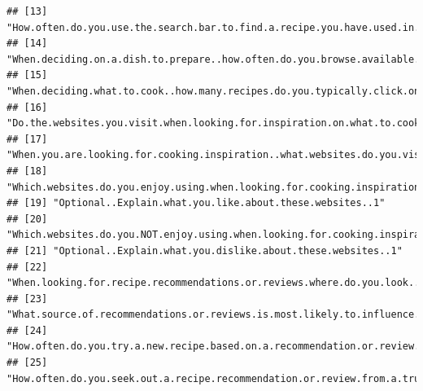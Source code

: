 \documentclass[
]{article}
\begin{document}
\begin{verbatim}
## [13] "How.often.do.you.use.the.search.bar.to.find.a.recipe.you.have.used.in.the.past."                                                                                                                           
## [14] "When.deciding.on.a.dish.to.prepare..how.often.do.you.browse.available.articles.or.recipe.collections.for.inspiration.on.what.to.cook."                                                                     
## [15] "When.deciding.what.to.cook..how.many.recipes.do.you.typically.click.on.before.you.find.a.suitable.recipe."                                                                                                 
## [16] "Do.the.websites.you.visit.when.looking.for.inspiration.on.what.to.cook.differ.from.the.websites.you.use.to.find.specific.recipes...i.e.looking.for.Mexican.food.instead.of.specifically.a.carnitas.recipe."
## [17] "When.you.are.looking.for.cooking.inspiration..what.websites.do.you.visit.the.most.."                                                                                                                       
## [18] "Which.websites.do.you.enjoy.using.when.looking.for.cooking.inspiration."                                                                                                                                   
## [19] "Optional..Explain.what.you.like.about.these.websites..1"                                                                                                                                                   
## [20] "Which.websites.do.you.NOT.enjoy.using.when.looking.for.cooking.inspiration."                                                                                                                               
## [21] "Optional..Explain.what.you.dislike.about.these.websites..1"                                                                                                                                                
## [22] "When.looking.for.recipe.recommendations.or.reviews.where.do.you.look..Select.all.that.apply"                                                                                                               
## [23] "What.source.of.recommendations.or.reviews.is.most.likely.to.influence.your.recipe.choice..Select.all.that.apply"                                                                                           
## [24] "How.often.do.you.try.a.new.recipe.based.on.a.recommendation.or.review.from.a.trusted.source."                                                                                                              
## [25] "How.often.do.you.seek.out.a.recipe.recommendation.or.review.from.a.trusted.source."                                                                                                                        

\end{verbatim}
\end{document}
